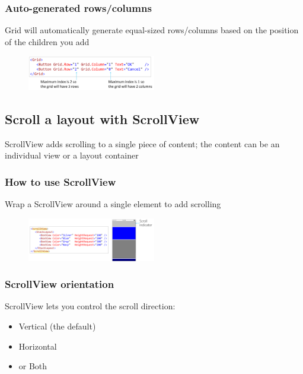 \documentclass{article}
\begin{document}
\subsubsection{Auto-generated rows/columns}

Grid will automatically generate equal-sized rows/columns based on the position of the children you add

\begin{figure}[H]
    \centering
    \includegraphics[width=0.5\textwidth]{xaml-grid-autogenerated.png}
    \caption{}
\end{figure}

\subsection{Scroll a layout with ScrollView}

ScrollView adds scrolling to a single piece of content; the content can be an
individual view or a layout container

\subsubsection{How to use ScrollView}

Wrap a ScrollView around a single element to add scrolling

\begin{figure}[H]
    \centering
    \includegraphics[width=0.5\textwidth]{xaml-scrollview.png}
    \caption{}
\end{figure}

\subsubsection{ScrollView orientation}

ScrollView lets you control the scroll direction: 

\begin{itemize}
    \item Vertical (the default)
    \item Horizontal
    \item or Both
\end{itemize}
\end{document}
